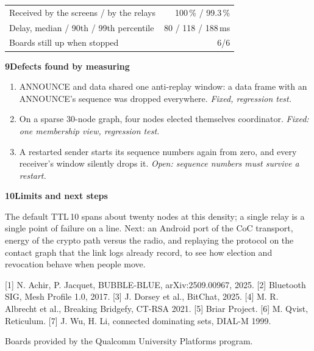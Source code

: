 \documentclass{article}
\renewcommand{\small}{\fontsize{24}{31}\selectfont}
\newcommand{\sect}[1]{\par\vfill\vspace{8mm}%
  {\color{navy}\fontsize{46}{52}\selectfont\bfseries #1\par}%
  \vspace{2mm}{\color{accent}\rule{\linewidth}{1.2mm}}\par\vspace{2mm}}
\begin{document}
\begin{minipage}[t][935mm][t]{245mm}
{\small
\begin{tabularx}{\linewidth}{@{}Xr@{}}
\toprule
Received by the screens / by the relays & 100\,\% / 99.3\,\% \\
Delay, median / 90th / 99th percentile & 80 / 118 / 188\,ms \\
Boards still up when stopped & 6/6 \\
\bottomrule
\end{tabularx}}

\sect{9\enspace Defects found by measuring}
\begin{enumerate}[label=\arabic*., leftmargin=10mm]
  \item ANNOUNCE and data shared one anti-replay window: a data frame
        with an ANNOUNCE's sequence was dropped everywhere. \emph{Fixed,
        regression test.}
  \item On a sparse 30-node graph, four nodes elected themselves
        coordinator. \emph{Fixed: one membership view, regression test.}
  \item A restarted sender starts its sequence numbers again from zero,
        and every receiver's window silently drops it. \emph{Open:
        sequence numbers must survive a restart.}
\end{enumerate}

\sect{10\enspace Limits and next steps}
The default TTL\,10 spans about twenty nodes at this density; a
single relay is a single point of failure on a line. Next: an Android port of the CoC transport, energy of
the crypto path versus the radio, and replaying the protocol on the
contact graph that the link logs already record, to see how election and
revocation behave when people move.

\vspace{6mm}
{\fontsize{16}{20}\selectfont\color{muted}
[1] N. Achir, P. Jacquet, BUBBLE-BLUE, arXiv:2509.00967, 2025.
[2] Bluetooth SIG, Mesh Profile 1.0, 2017.
[3] J. Dorsey et al., BitChat, 2025.
[4] M. R. Albrecht et al., Breaking Bridgefy, CT-RSA 2021.
[5] Briar Project.
[6] M. Qvist, Reticulum.
[7] J. Wu, H. Li, connected dominating sets, DIAL-M 1999.
\par\vspace{3mm}
Boards provided by the Qualcomm University Platforms program.\par}
\end{minipage}
\end{document}
